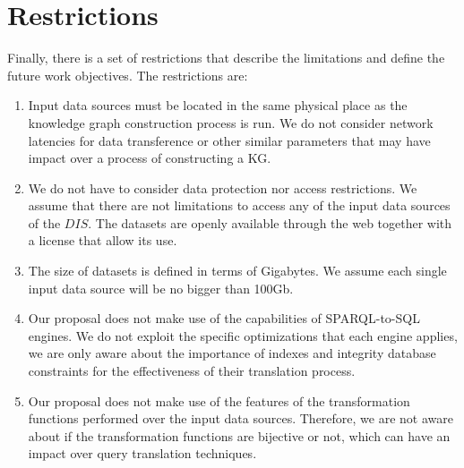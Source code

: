 \section{Restrictions}
Finally, there is a set of restrictions that describe the limitations and define the future work objectives. The restrictions are:

\begin{enumerate}[label=\textbf{R{\arabic*}}]
    \item Input data sources must be located in the same physical place as the knowledge graph construction process is run. We do not consider network latencies for data transference or other similar parameters that may have impact over a process of constructing a KG. 
     \item We do not have to consider data protection nor access restrictions. We assume that there are not limitations to access any of the input data sources of the $DIS$. The datasets are openly available through the web together with a license that allow its use.
    \item The size of datasets is defined in terms of Gigabytes. We assume each single input data source will be no bigger than 100Gb.
    \item Our proposal does not make use of the capabilities of SPARQL-to-SQL engines. We do not exploit the specific optimizations that each engine applies, we are only aware about the importance of indexes and integrity database constraints for the effectiveness of their translation process.
    \item Our proposal does not make use of the features of the transformation functions performed over the input data sources. Therefore, we are not aware about if the transformation functions are bijective or not, which can have an impact over query translation techniques.  
\end{enumerate}
